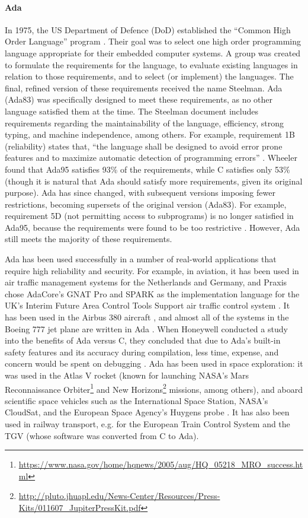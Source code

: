 \paragraph{Ada}
In 1975, the US Department of Defence (DoD) established the ``Common High Order Language'' program \cite{wheeler1997}.
Their goal was to select one high order programming language appropriate for their embedded computer systems.
A group was created to formulate the requirements for the language, to evaluate existing languages in relation to those requirements, and to select (or implement) the languages.
The final, refined version of these requirements received the name Steelman.
Ada (Ada83) was specifically designed to meet these requirements, as no other language satisfied them at the time.
The Steelman document includes requirements regarding the maintainability of the language, efficiency, strong typing, and machine independence, among others.
For example, requirement 1B (reliability) states that, ``the language shall be designed to avoid error prone features and to maximize automatic detection of programming errors'' \cite{wheeler1997}.
Wheeler found that Ada95 satisfies 93\% of the requirements, while C satisfies only 53\% (though it is natural that Ada should satisfy more requirements, given its original purpose).
Ada has since changed, with subsequent versions imposing fewer restrictions, becoming supersets of the original version (Ada83).
For example, requirement 5D (not permitting access to subprograms) is no longer satisfied in Ada95, because the requirements were found to be too restrictive \cite{wheeler1997}.
However, Ada still meets the majority of these requirements.

Ada has been used successfully in a number of real-world applications that require high reliability and security.
For example, in aviation, it has been used in air traffic management systems for the Netherlands and Germany, and Praxis chose AdaCore's GNAT Pro and SPARK as the implementation language for the UK's Interim Future Area Control Tools Support air traffic control system \cite{adacore2007}.
It has been used in the Airbus 380 aircraft \cite{feldman2014}, and almost all of the systems in the Boeing 777 jet plane are written in Ada \cite{adaicBoeing}.
When Honeywell conducted a study into the benefits of Ada versus C, they concluded that due to Ada's built-in safety features and its accuracy during compilation, less time, expense, and concern would be spent on debugging \cite{adaicBoeing}.
Ada has been used in space exploration: it was used in the Atlas V rocket (known for launching NASA's Mars Reconnaissance Orbiter\footnote{\url{https://www.nasa.gov/home/hqnews/2005/aug/HQ_05218_MRO_success.html}} and New Horizons\footnote{\url{http://pluto.jhuapl.edu/News-Center/Resources/Press-Kits/011607_JupiterPressKit.pdf}} missions, among others), and aboard scientific space vehicles such as the International Space Station, NASA's CloudSat, and the European Space Agency's Huygens probe \cite{feldman2014}.
It has also been used in railway transport, e.g. for the European Train Control System and the TGV (whose software was converted from C to Ada).

